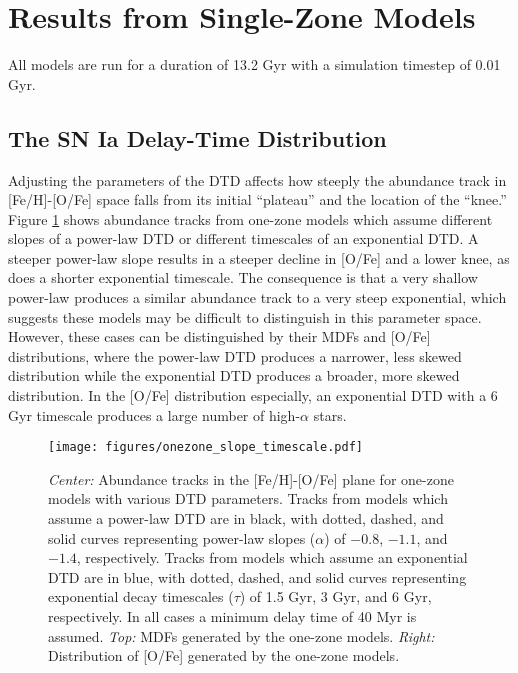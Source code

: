 \documentclass[twocolumn,linenumbers,twocolappendix]{aastex631}
\begin{document}
\section{Results from Single-Zone Models}
\label{sec:onezone-results}

All models are run for a duration of 13.2 Gyr with a simulation timestep of 0.01 Gyr.

\subsection{The SN Ia Delay-Time Distribution}

Adjusting the parameters of the DTD affects how steeply the abundance track in [Fe/H]-[O/Fe] space falls from its initial ``plateau'' and the location of the ``knee.'' Figure \ref{fig:onezone-slope-timescale} shows abundance tracks from one-zone models which assume different slopes of a power-law DTD or different timescales of an exponential DTD. A steeper power-law slope results in a steeper decline in [O/Fe] and a lower knee, as does a shorter exponential timescale. The consequence is that a very shallow power-law produces a similar abundance track to a very steep exponential, which suggests these models may be difficult to distinguish in this parameter space. However, these cases can be distinguished by their MDFs and [O/Fe] distributions, where the power-law DTD produces a narrower, less skewed distribution while the exponential DTD produces a broader, more skewed distribution. In the [O/Fe] distribution especially, an exponential DTD with a 6 Gyr timescale produces a large number of high-$\alpha$ stars.

\begin{figure}
    \centering
    \texttt{[image: figures/onezone\_slope\_timescale.pdf]}
    \caption{\textit{Center:} Abundance tracks in the [Fe/H]-[O/Fe] plane for one-zone models with various DTD parameters. Tracks from models which assume a power-law DTD are in black, with dotted, dashed, and solid curves representing power-law slopes ($\alpha$) of $-0.8$, $-1.1$, and $-1.4$, respectively. Tracks from models which assume an exponential DTD are in blue, with dotted, dashed, and solid curves representing exponential decay timescales ($\tau$) of 1.5 Gyr, 3 Gyr, and 6 Gyr, respectively. In all cases a minimum delay time of 40 Myr is assumed. \textit{Top:} MDFs generated by the one-zone models. \textit{Right:} Distribution of [O/Fe] generated by the one-zone models.}
    \label{fig:onezone-slope-timescale}
\end{figure}
\end{document}
